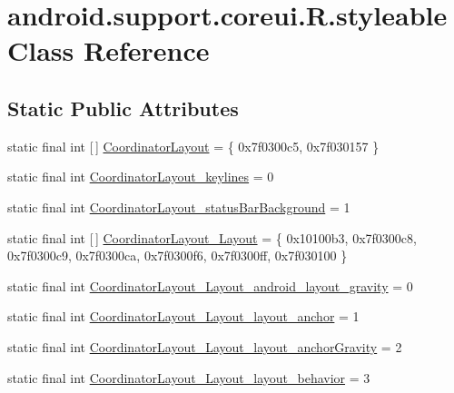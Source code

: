 \hypertarget{classandroid_1_1support_1_1coreui_1_1_r_1_1styleable}{}\section{android.\+support.\+coreui.\+R.\+styleable Class Reference}
\label{classandroid_1_1support_1_1coreui_1_1_r_1_1styleable}
\subsection*{Static Public Attributes}
\begin{DoxyCompactItemize}
\item 
static final int \mbox{[}$\,$\mbox{]} \mbox{\hyperlink{classandroid_1_1support_1_1coreui_1_1_r_1_1styleable_a5f138b7d031bc5b3efaee0de2c80c1bc}{Coordinator\+Layout}} = \{ 0x7f0300c5, 0x7f030157 \}
\item 
static final int \mbox{\hyperlink{classandroid_1_1support_1_1coreui_1_1_r_1_1styleable_ae01cf8a2b243f8e400d11342e2089e54}{Coordinator\+Layout\+\_\+keylines}} = 0
\item 
static final int \mbox{\hyperlink{classandroid_1_1support_1_1coreui_1_1_r_1_1styleable_a7d252d64de79ad7cc3107ca185f4c548}{Coordinator\+Layout\+\_\+status\+Bar\+Background}} = 1
\item 
static final int \mbox{[}$\,$\mbox{]} \mbox{\hyperlink{classandroid_1_1support_1_1coreui_1_1_r_1_1styleable_aeafaddca629c939b2e408602bba424a4}{Coordinator\+Layout\+\_\+\+Layout}} = \{ 0x10100b3, 0x7f0300c8, 0x7f0300c9, 0x7f0300ca, 0x7f0300f6, 0x7f0300ff, 0x7f030100 \}
\item 
static final int \mbox{\hyperlink{classandroid_1_1support_1_1coreui_1_1_r_1_1styleable_ad7bd107e7df23d88dd7e079b08da7bef}{Coordinator\+Layout\+\_\+\+Layout\+\_\+android\+\_\+layout\+\_\+gravity}} = 0
\item 
static final int \mbox{\hyperlink{classandroid_1_1support_1_1coreui_1_1_r_1_1styleable_a8a4760cc405c14d82d8fa97315b4df5e}{Coordinator\+Layout\+\_\+\+Layout\+\_\+layout\+\_\+anchor}} = 1
\item 
static final int \mbox{\hyperlink{classandroid_1_1support_1_1coreui_1_1_r_1_1styleable_a742a75ed8b8a9f809a19cc529efbb461}{Coordinator\+Layout\+\_\+\+Layout\+\_\+layout\+\_\+anchor\+Gravity}} = 2
\item 
static final int \mbox{\hyperlink{classandroid_1_1support_1_1coreui_1_1_r_1_1styleable_a578cf5f98faa792ae0d90a64f077c87c}{Coordinator\+Layout\+\_\+\+Layout\+\_\+layout\+\_\+behavior}} = 3

\end{DoxyCompactItemize}
